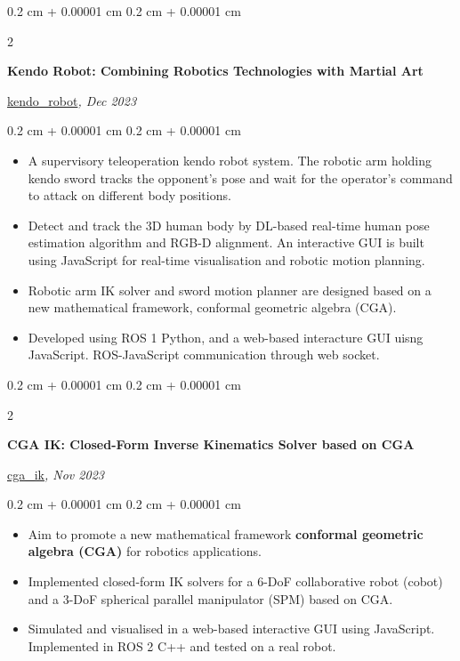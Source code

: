 \documentclass[10pt, letterpaper]{article}
\newenvironment{highlights}{
    \begin{itemize}[
        topsep=0.10 cm,
        parsep=0.10 cm,
        partopsep=0pt,
        itemsep=0pt,
        leftmargin=0.4 cm + 10pt
    ]
}{
    \end{itemize}
} %
\newenvironment{onecolentry}{
    \begin{adjustwidth}{
        0.2 cm + 0.00001 cm
    }{
        0.2 cm + 0.00001 cm
    }
}{
    \end{adjustwidth}
} %
\newenvironment{twocolentry}[2][]{
    \onecolentry
    \def\secondColumn{#2}
    \setcolumnwidth{\fill, 4.5 cm}
    \begin{paracol}{2}
}{
    \switchcolumn \raggedleft \secondColumn
    \end{paracol}
    \endonecolentry
} %
\let\hrefWithoutArrow\href
\renewcommand{\href}[2]{\hrefWithoutArrow{#1}{\ifthenelse{\equal{#2}{}}{ }{#2 }\raisebox{.15ex}{\footnotesize \faExternalLink*}}}
\begin{document}
        \begin{twocolentry}{
        \hrefWithoutArrow{https://github.com/wei-hsuan-cheng/kendo_robot}{{\footnotesize\faGithub}\hspace*{0.13cm}kendo\_robot}\textit{, Dec 2023}
        }
            \textbf{Kendo Robot: Combining Robotics Technologies with Martial Art}
        \end{twocolentry}
        \vspace{0.10 cm}
        \begin{onecolentry}
            \begin{highlights}
                \item A supervisory teleoperation kendo robot system. The robotic arm holding kendo sword tracks the opponent’s pose and wait for the operator’s command to attack on different body positions.
                \item Detect and track the 3D human body by DL-based real-time human pose estimation algorithm and RGB-D alignment. An interactive GUI is built using JavaScript for real-time visualisation and robotic motion planning.
                \item Robotic arm IK solver and sword motion planner are designed based on a new mathematical framework, conformal geometric algebra (CGA).
                \item Developed using ROS 1 Python, and a web-based interacture GUI uisng JavaScript. ROS-JavaScript communication through web socket.
            \end{highlights}
        \end{onecolentry}

        \vspace{0.2 cm}

        \begin{twocolentry}{
        \hrefWithoutArrow{https://github.com/wei-hsuan-cheng/cga_ik}{{\footnotesize\faGithub}\hspace*{0.13cm}cga\_ik}\textit{, Nov 2023}
        }
            \textbf{CGA IK: Closed-Form Inverse Kinematics Solver based on CGA}
        \end{twocolentry}
        \vspace{0.10 cm}
        \begin{onecolentry}
            \begin{highlights}
                \item Aim to promote a new mathematical framework \textbf{conformal geometric algebra (CGA)} for robotics applications. 
                \item Implemented closed-form IK solvers for a 6-DoF collaborative robot (cobot) and a 3-DoF spherical parallel manipulator (SPM) based on CGA.
                \item Simulated and visualised in a web-based interactive GUI using JavaScript. Implemented in  ROS 2 C++ and tested on a real robot.
            \end{highlights}
        \end{onecolentry}
\end{document}
